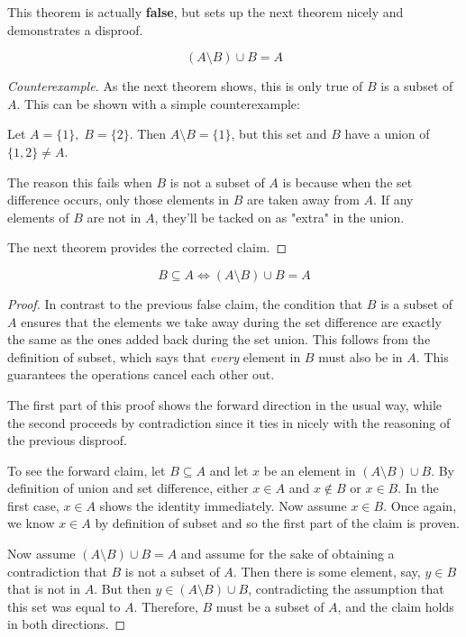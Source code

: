 \documentclass{standalone}
\begin{document}
\begin{theorem}
  This theorem is actually \textbf{false}, but sets up the next theorem nicely
  and demonstrates a disproof.

  \[
    (A \setminus B) \cup B = A
  \]
\end{theorem}

\begin{proof}[Counterexample]
  As the next theorem shows, this is only true of $B$ is a subset of $A$. This
  can be shown with a simple counterexample:

  Let $A = \{1\}, \; B = \{2\}$. Then $A \setminus B = \{1\}$, but this set and
  $B$ have a union of $\{1, 2\} \neq A$.

  The reason this fails when $B$ is not a subset of $A$ is because when the set
  difference occurs, only those elements in $B$ are taken away from $A$. If any
  elements of $B$ are not in $A$, they'll be tacked on as "extra" in the union.

  The next theorem provides the corrected claim.
\end{proof}

\begin{theorem}
  \[
    B \subseteq A \iff (A \setminus B) \cup B = A
  \]
\end{theorem}

\begin{proof}
  In contrast to the previous false claim, the condition that $B$ is a subset
  of $A$ ensures that the elements we take away during the set difference are
  exactly the same as the ones added back during the set union. This follows
  from the definition of subset, which says that \emph{every} element in $B$
  must also be in $A$. This guarantees the operations cancel each other out.

  The first part of this proof shows the forward direction in the usual way,
  while the second proceeds by contradiction since it ties in nicely with the
  reasoning of the previous disproof.

  To see the forward claim, let $B \subseteq A$ and let $x$ be an element in
  $(A \setminus B) \cup B$. By definition of union and set difference, either
  $x \in A$ and $x \not \in B$ or $x \in B$. In the first case, $x \in A$ shows
  the identity immediately. Now assume $x \in B$. Once again, we know $x \in A$
  by definition of subset and so the first part of the claim is proven.

  Now assume $(A \setminus B) \cup B = A$ and assume for the sake of obtaining
  a contradiction that $B$ is not a subset of $A$. Then there is some element,
  say, $y \in B$ that is not in $A$. But then $y \in (A \setminus B) \cup B$,
  contradicting the assumption that this set was equal to $A$. Therefore, $B$
  must be a subset of $A$, and the claim holds in both directions.
\end{proof}
\end{document}
